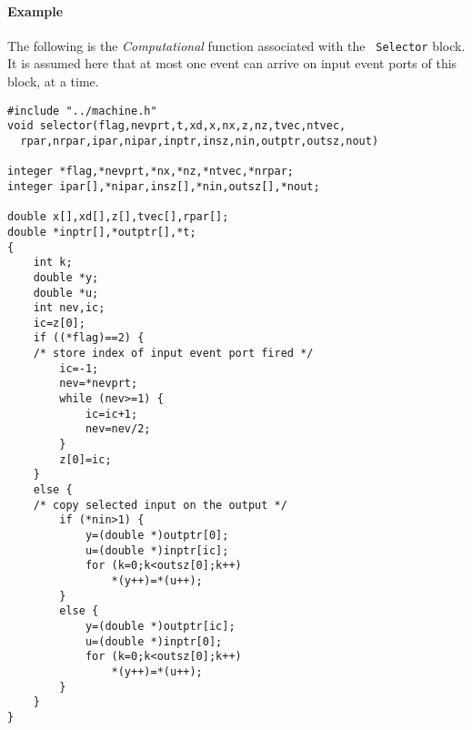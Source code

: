 \documentclass{book}
\newcommand{\computational}{{\em Computational }}
\begin{document}
\paragraph{Example}
The following is the \computational function associated with the {\tt
 Selector} block. It is assumed here that at most one event can arrive
on input event ports of this block, at a time.
\begin{verbatim}
#include "../machine.h"
void selector(flag,nevprt,t,xd,x,nx,z,nz,tvec,ntvec,
  rpar,nrpar,ipar,nipar,inptr,insz,nin,outptr,outsz,nout)

integer *flag,*nevprt,*nx,*nz,*ntvec,*nrpar;
integer ipar[],*nipar,insz[],*nin,outsz[],*nout;

double x[],xd[],z[],tvec[],rpar[];
double *inptr[],*outptr[],*t;
{
    int k;
    double *y;
    double *u;
    int nev,ic;
    ic=z[0];
    if ((*flag)==2) {
    /* store index of input event port fired */
        ic=-1;
        nev=*nevprt;
        while (nev>=1) {
            ic=ic+1;
            nev=nev/2;
        }
        z[0]=ic;
    }
    else {
    /* copy selected input on the output */
        if (*nin>1) {
            y=(double *)outptr[0];
            u=(double *)inptr[ic];
            for (k=0;k<outsz[0];k++)
                *(y++)=*(u++);  
        }
        else {
            y=(double *)outptr[ic];
            u=(double *)inptr[0];
            for (k=0;k<outsz[0];k++)
                *(y++)=*(u++);  
        }
    }
}
\end{verbatim}
\end{document}
